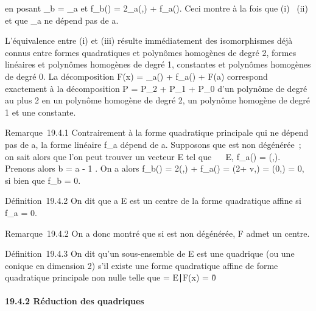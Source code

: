 \documentclass[]{article}
\begin{document}
en posant \Phi_b = \Phi_a et
f_b(\overrightarrow\xi) =
2\phi_a(\overrightarrowab,\overrightarrow\xi)
+ f_a(\overrightarrow\xi). Ceci montre à la
fois que (i) \rigtharrow~(ii) et que \Phi_a ne dépend pas de a.

L'équivalence entre (i) et (iii) résulte immédiatement des isomorphismes
déjà connus entre formes quadratiques et polynômes homogènes de degré 2,
formes linéaires et polynômes homogènes de degré 1, constantes et
polynômes homogènes de degré 0. La décomposition F(x) =
\Phi_a(\overrightarrowax) +
f_a(\overrightarrowax) + F(a) correspond
exactement à la décomposition P = P_2 + P_1 +
P_0 d'un polynôme de degré au plus 2 en un polynôme homogène de
degré 2, un polynôme homogène de degré 1 et une constante.

Remarque~19.4.1 Contrairement à la forme quadratique principale \Phi qui ne
dépend pas de a, la forme linéaire f_a dépend de a. Supposons
que \Phi est non dégénérée~; on sait alors que l'on peut trouver un vecteur
\vecv \in\vec E tel que
\forall~\vec\xi~
\in\vec E, f_a(\vec\xi) =
\phi(\vecv,\vec\xi). Prenons alors b =
a - 1  \vecv. On a alors
f_b(\vec\xi) =
2\phi(\overrightarrowab,\vec\xi) +
f_a(\vec\xi) =
\phi(2\overrightarrowab +\vec
v,\vec\xi) = \phi(0,\vec\xi) = 0, si
bien que f_b = 0.

Définition~19.4.2 On dit que a \in E est un centre de la forme quadratique
affine si f_a = 0.

Remarque~19.4.2 On a donc montré que si \Phi est non dégénérée, F admet un
centre.

Définition~19.4.3 On dit qu'un sous-ensemble \Sigma de E est une quadrique
(ou une conique en dimension 2) s'il existe une forme quadratique affine
de forme quadratique principale non nulle telle que \Sigma =
\x \in E∣F(x) =
0\.

\paragraph{19.4.2 Réduction des quadriques}
\end{document}
